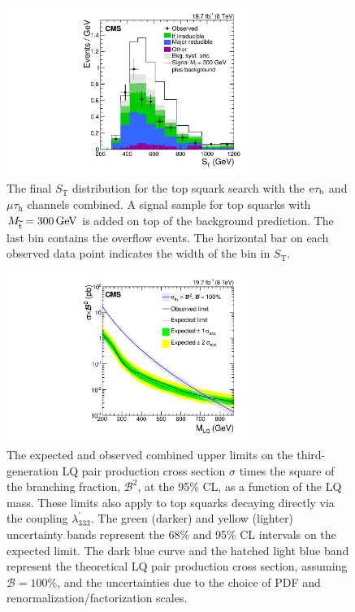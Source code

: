 \documentclass[12pt]{thesis}  %
\newcommand{\tauh}{\ensuremath{\tau_{\text{h}}}\xspace}
\newcommand{\Pe}{\ensuremath{\cmsSymbolFace{e}}\xspace}
\newcommand{\mutau}{\ensuremath{\mu\tauh}\xspace}
\newcommand{\etau}{\ensuremath{\Pe\tauh}\xspace}
\newcommand{\Mstop}{\ensuremath{M_{\sTop}}\xspace}
\def\ST{\ensuremath{S_{\text{T}}}\xspace}
\begin{document}
\begin{figure}[htbp]
  \centering
    \includegraphics[width=0.7\textwidth]{figures/final/st_lqd321.pdf}
    \caption{The final \ST distribution for the top squark search with the \etau and \mutau channels combined.
             A signal sample for top squarks with $\Mstop=300\GeV$ is added on top of the background prediction.
             The last bin contains the overflow events. The horizontal bar on each observed data point indicates the width of the bin in \ST.
           }
    \label{Res:fig:STfinalLQD321}
\end{figure}

\begin{figure}[htbp]
  \centering
    \includegraphics[width=0.7\textwidth]{figures/final/BR_Sigma_TauTau_LQ.pdf}
    \caption{The expected and observed combined upper limits on the third-gen\-er\-a\-tion LQ pair production cross section $\sigma$ times the square of the branching fraction, $\mathcal{B}^2$, at the 95\% CL, as a function of the LQ mass. These limits also apply to top squarks decaying directly via the coupling $\lambda^{\prime}_{333}$. The green (darker) and yellow (lighter) uncertainty bands represent the 68\% and 95\% CL intervals on the expected limit. The dark blue curve and the hatched light blue band represent the theoretical LQ pair production cross section, assuming $\mathcal{B}=100\%$, and the uncertainties due to the choice of PDF and renormalization/factorization scales.}
    \label{Res:fig:asymptoticCombLQ}
\end{figure}
\end{document}
